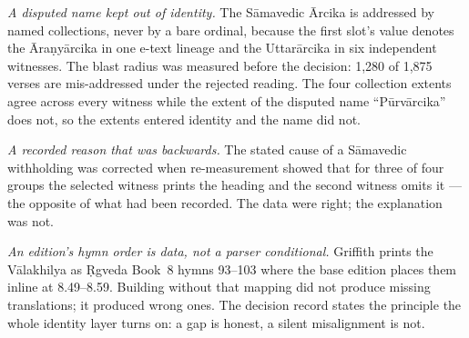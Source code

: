 \emph{A disputed name kept out of identity.} The S\=amavedic \=Arcika is addressed by
named collections, never by a bare ordinal, because the first slot's value 
denotes the \=Ara\d{n}y\=arcika in one e-text lineage and the Uttar\=arcika in six
independent witnesses. The blast radius was measured before the decision: 1{,}280 of
1{,}875 verses are mis-addressed under the rejected reading. The four collection
extents agree across every witness while the extent of the disputed name
``P\=urv\=arcika'' does not, so the extents entered identity and the name did not.

\emph{A recorded reason that was backwards.} The stated cause of a S\=amavedic
withholding was corrected when re-measurement showed that for three of four groups the
selected witness prints the  heading and the second witness omits it ---
the opposite of what had been recorded. The data were right; the explanation was not.

\emph{An edition's hymn order is data, not a parser conditional.} Griffith prints the
V\=alakhilya as \d{R}gveda Book~8 hymns 93--103 where the base edition places them
inline at 8.49--8.59. Building without that mapping did not produce missing
translations; it produced wrong ones. The decision record states the principle the
whole identity layer turns on: a gap is honest, a silent misalignment is not.
